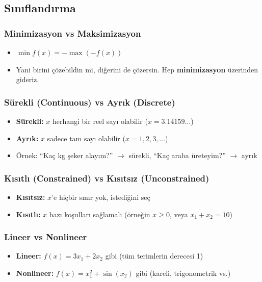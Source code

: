 \documentclass[12pt,a4paper]{article}
\theoremstyle{definition}
\theoremstyle{remark}
\begin{document}
\subsection{S{\i}n{\i}fland{\i}rma}

\subsubsection{Minimizasyon vs Maksimizasyon}
\begin{itemize}
    \item $\min f(x) = -\max(-f(x))$
    \item Yani birini \c{c}\"ozebildin mi, di\u{g}erini de \c{c}\"ozersin. Hep \textbf{minimizasyon} \"uzerinden gideriz.
\end{itemize}

\subsubsection{S\"urekli (Continuous) vs Ayr{\i}k (Discrete)}
\begin{itemize}
    \item \textbf{S\"urekli:} $x$ herhangi bir reel say{\i} olabilir ($x = 3.14159\ldots$)
    \item \textbf{Ayr{\i}k:} $x$ sadece tam say{\i} olabilir ($x = 1, 2, 3, \ldots$)
    \item \"Ornek: ``Ka\c{c} kg \c{s}eker alay{\i}m?'' $\to$ s\"urekli, ``Ka\c{c} araba \"ureteyim?'' $\to$ ayr{\i}k
\end{itemize}

\subsubsection{K{\i}s{\i}tl{\i} (Constrained) vs K{\i}s{\i}ts{\i}z (Unconstrained)}
\begin{itemize}
    \item \textbf{K{\i}s{\i}ts{\i}z:} $x$'e hi\c{c}bir s{\i}n{\i}r yok, istedi\u{g}ini se\c{c}
    \item \textbf{K{\i}s{\i}tl{\i}:} $x$ baz{\i} ko\c{s}ullar{\i} sa\u{g}lamal{\i} (\"orne\u{g}in $x \geq 0$, veya $x_1 + x_2 = 10$)
\end{itemize}

\subsubsection{Lineer vs Nonlineer}
\begin{itemize}
    \item \textbf{Lineer:} $f(x) = 3x_1 + 2x_2$ gibi (t\"um terimlerin derecesi 1)
    \item \textbf{Nonlineer:} $f(x) = x_1^2 + \sin(x_2)$ gibi (kareli, trigonometrik vs.)
\end{itemize}
\end{document}
